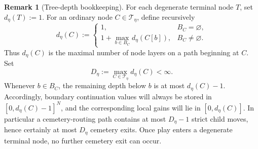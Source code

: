 \documentclass[12pt]{article}
\theoremstyle{definition}
\newtheorem{remark}[theorem]{Remark}
\newcommand{\1}{\mathbf{1}}
\newcommand{\cT}{\mathcal{T}}
\begin{document}
\begin{remark}[Tree-depth bookkeeping]
\label{rem:tree-depth}
For each degenerate terminal node $T$, set $d_\eta(T):=1$. For an ordinary node
$C\in\cT_\eta$, define recursively
\[
d_\eta(C)
:=
\begin{cases}
1, & B_C=\varnothing,\\[0.3em]
1+\max_{b\in B_C} d_\eta(C[b]), & B_C\neq \varnothing.
\end{cases}
\]
Thus $d_\eta(C)$ is the maximal number of node layers on a path beginning at $C$.
Set
\[
D_\eta:=\max_{C\in\cT_\eta} d_\eta(C)<\infty.
\]
Whenever $b\in B_C$, the remaining depth below $b$ is at most $d_\eta(C)-1$.
Accordingly, boundary continuation values will always be stored in
$[0,d_\eta(C)-1]^N$, and the corresponding local gains will lie in
$[0,d_\eta(C)]$. In particular a cemetery-routing path contains at most
$D_\eta-1$ strict child moves, hence certainly at most $D_\eta$ cemetery exits.
Once play enters a degenerate terminal node, no further cemetery exit can occur.
\end{remark}
\end{document}
